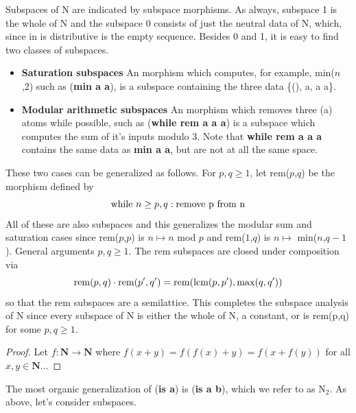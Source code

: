 \documentclass[11pt]{article}
\begin{document}
    Subspaces of N are indicated by subspace morphisms.  As always, subspace 1 is the whole of N and the subspace 0 consists of just the neutral data of N, which, since in is distributive is the empty sequence.
Besides 0 and 1, it is easy to find two classes of subspaces.  
\begin{itemize} 
\item {\bf Saturation subspaces} An morphism which computes, for example, min($n$,2) such as ({\bf min a a}), is a subspace containing the three data \{(), a, a a\}. 
\item {\bf Modular arithmetic subspaces} An morphism which removes three (a) atoms while possible, such as ({\bf while rem a a a}) is a subspace which computes the sum of it's inputs modulo 3.  Note 
that {\bf while rem a a a} contains the same data as {\bf min a a}, but are not at all the same space. 
\end{itemize}
These two cases can be generalized as follows.  For $p,q\ge 1$, let rem($p$,$q$) be the morphism defined by 
\begin{equation}
{\rm while}\ n\ge p,q: {\rm remove\ p\ from\ n}
\end{equation}
All of these are also subspaces and this generalizes the modular sum and saturation cases since rem($p$,$p$) is $n\mapsto n$ mod $p$ and rem($1$,$q$) is $n\mapsto$ min($n$,$q-1$).   General arguments $p,q\ge 1$.  The rem subspaces are closed under composition via 
\begin{equation}
{\rm rem}(p,q)\cdot {\rm rem}(p',q') = {\rm rem}({\rm lcm}(p,p'),{\rm max}(q,q'))
\end{equation}
so that the rem subspaces are a semilattice.  This completes the subspace analysis of N since every subspace of N is either the whole of N, a constant, or is rem(p,q) for some $p,q\ge1$. 

\begin{proof}
Let $f:{\mathbf N}\rightarrow{\mathbf N}$ where $f(x+y)=f(f(x)+y)=f(x+f(y))$ for all $x,y\in\mathbf N$...
\end{proof}

The most organic generalization of ({\bf is a}) is ({\bf is a b}), which we refer to as N$_2$.  As above, let's consider subspaces.  
\end{document}
